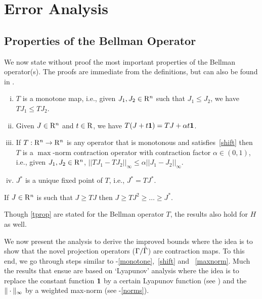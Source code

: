 \section{Error Analysis}\label{sec:improv}
\subsection{Properties of the Bellman Operator}
We now state without proof the most important properties of the Bellman operator(s).
The proofs are immediate from the definitions, but can also be found in \cite{BertB}.
\begin{comment}
First, we introduce some extra notation:
For $J_1,J_2\in \R^n$, we write $J_1\le J_2$ if $J_1(s)\le J_2(s)$ holds for all $s\in S$.
We use $\one \in \R^n$ to denote a vector with all entries $1$.
The maximum norm $\norm{\cdot}_{\infty}$ is defined by $ \norm{v}_{\infty} = \max_{s\in S} |v(s)|$.
\end{comment}
\begin{lemma}\label{tprop}
\begin{enumerate}[(i)]
\item \label{monotone}$T$ is a monotone map, i.e., given $J_1,J_2 \in \mathrm{R}^n$ such that $J_1\leq J_2$, we have $T J_1\leq T J_2$.
\item \label{shift}
Given $J\in \mathrm{R}^n$ and $t \in \mathrm{R}$, we have $T(J+t\mathbf{1})=TJ+\alpha t\mathbf{1}$.
\item \label{maxnorm}
If $T: \mathrm{R}^n \to \mathrm{R}^n$ is any operator that is monotonous and satisfies~\eqref{shift} then
$T$ is a $\max$-norm contraction operator with contraction factor $\alpha \in (0,1)$, i.e., given $J_1, J_2 \in \mathrm{R}^n$,
$
||TJ_1-TJ_2||_\infty\leq \alpha ||J_1-J_2||_\infty.
$
\item \label{uniquesol}
$J^*$ is a unique fixed point of $T$, i.e., $J^*=TJ^*$.
\end{enumerate}
\end{lemma}
\begin{corollary}
If $J\in \mathrm{R}^n$ is such that $J\geq TJ$ then $J\geq TJ^2\geq \ldots \geq J^*$.
\end{corollary}
Though \cref{tprop} are stated for the Bellman operator $T$, the results also hold for $H$ as well.\par
We now present the analysis to derive the improved bounds where the idea is to show that the novel projection operators ($\Gamma/\hat{\Gamma}$) are contraction maps. To this end, we go through steps similar to -\eqref{monotone},~\eqref{shift} and ~\eqref{maxnorm}. Much the results that ensue are based on `Lyapunov' analysis where the idea is to replace the constant function $\mathbf{1}$ by a certain Lyapunov function (see ) and the $\|\cdot\|_{\infty}$ by a weighted max-norm (see -\eqref{norms}).
